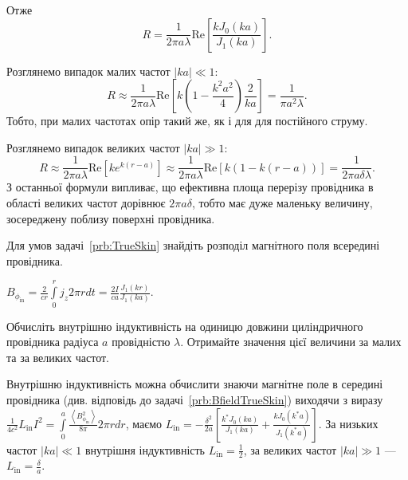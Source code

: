 \begin{problem}
\begin{solution}
Отже 
\[
    R = \frac{1}{2\pi a\lambda}  \mathrm{Re}\left[  \frac{kJ_0(ka)}{J_1(ka)} \right].
\]

Розглянемо випадок малих частот $|ka| \ll 1$:
\[
    R \approx \frac{1}{2\pi a\lambda}  \mathrm{Re} \left[k\left( 1 - \frac{k^2a^2}{4}\right)\frac{2}{ka}  \right] = \frac{1}{\pi a^2 \lambda}.
\]
Тобто, при малих частотах опір такий же, як і для для постійного струму.

Розглянемо випадок великих частот $|ka| \gg 1$:
\[
    R \approx \frac{1}{2\pi a\lambda} \mathrm{Re}\left[  ke^{k(r-a)} \right] \approx \frac{1}{2\pi a\lambda} \mathrm{Re}\left[  k(1-k(r-a)) \right] =  \frac{1}{2\pi a\delta\lambda}.
\]
З останньої формули випливає, що ефективна площа перерізу провідника в області великих частот дорівнює $2\pi a\delta$, тобто має дуже маленьку величину, зосереджену поблизу поверхні провідника.
\end{solution}
\end{problem}

\begin{problem}\label{prb:BfieldTrueSkin}
    Для умов задачі~\ref{prb:TrueSkin} знайдіть розподіл магнітного поля всередині провідника.
\begin{solution}
    $B_{\phi_{\mathrm{in}}} = \frac{2}{cr} \int\limits_0^r j_z 2\pi r dt = \frac{2I}{ca} \frac{J_1(kr)}{J_1(ka)}$.
\end{solution}
\end{problem}


\begin{problem}
        Обчисліть внутрішню індуктивність на одиницю довжини циліндричного провідника радіуса $a$ провідністю $\lambda$. Отримайте значення цієї величини за малих та за великих частот.
\begin{solution}
    Внутрішню індуктивність можна обчислити знаючи магнітне поле в середині провідника (див. відповідь до задачі~\ref{prb:BfieldTrueSkin})  виходячи з виразу $\frac{1}{4c^2}L_\mathrm{in}I^2 = \int\limits_0^a \frac{\left\langle  B_{\phi_{\mathrm{in}}}^2\right\rangle }{8\pi} 2\pi rdr$, маємо 
    $L_\mathrm{in}  = -\frac{\delta^2}{2a}\left[ \frac{k^*J_0(ka)}{J_1(ka)} + \frac{kJ_0(k^*a)}{J_1(k^*a)}\right] $. За низьких частот $|ka| \ll 1$ внутрішня індуктивність  $L_\mathrm{in} = \frac12$, за великих частот $|ka| \gg 1$ --- $L_\mathrm{in} = \frac\delta a$.
\end{solution}
\end{problem}

